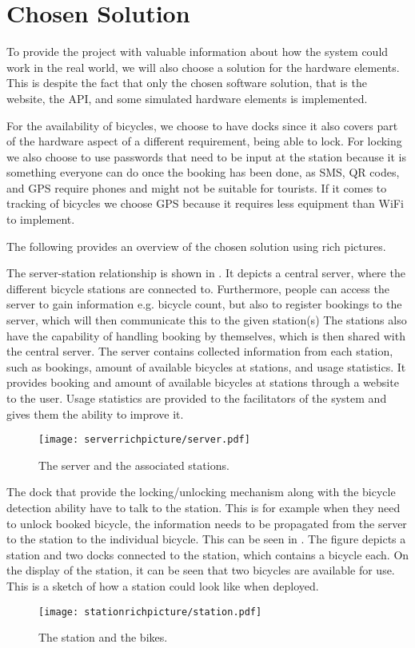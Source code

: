 \section{Chosen Solution}
To provide the project with valuable information about how the system could work in the real world, we will also choose a solution for the hardware elements.
This is despite the fact that only the chosen software solution, that is the website, the API, and some simulated hardware elements is implemented.

For the availability of bicycles, we choose to have docks since it also covers part of the hardware aspect of a different requirement, being able to lock.  
For locking we also choose to use passwords that need to be input at the station because it is something everyone can do once the booking has been done, as SMS, QR codes, and GPS require phones and might not be suitable for tourists.
If it comes to tracking of bicycles we choose GPS because it requires less equipment than WiFi to implement.

The following provides an overview of the chosen solution using rich pictures.

The server-station relationship is shown in .
It depicts a central server, where the different bicycle stations are connected to.
Furthermore, people can access the server to gain information e.g. bicycle count, but also to register bookings to the server, which will then communicate this to the given station(s)
The stations also have the capability of handling booking by themselves, which is then shared with the central server.
The server contains collected information from each station, such as bookings, amount of available bicycles at stations, and usage statistics.
It provides booking and amount of available bicycles at stations through a website to the user. 
Usage statistics are provided to the facilitators of the system and gives them the ability to improve it. 

\begin{figure}[h]
\centering
\texttt{[image: serverrichpicture/server.pdf]}
\caption{The server and the associated stations.}
\label{fig:ServerRichPicture}
\end{figure}

The dock that provide the locking/unlocking mechanism along with the bicycle detection ability have to talk to the station. 
This is for example when they need to unlock booked bicycle, the information needs to be propagated from the server to the station to the individual bicycle.
This can be seen in .
The figure depicts a station and two docks connected to the station, which contains a bicycle each. 
On the display of the station, it can be seen that two bicycles are available for use.
This is a sketch of how a station could look like when deployed.
\begin{figure}[h]
\centering
\texttt{[image: stationrichpicture/station.pdf]}
\caption{The station and the bikes.}
\label{fig:StationRichPicture}
\end{figure}